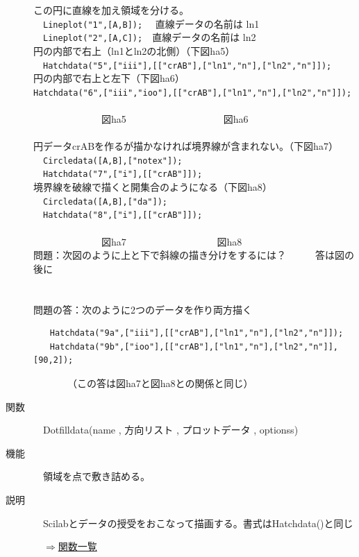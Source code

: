 \documentclass[papersize,a4paper,12pt,uplatex]{jsarticle}
\begin{document}
\begin{description}
この円に直線を加え領域を分ける。\\
　\verb|Lineplot("1",[A,B]);|　 直線データの名前は ln1\\
　\verb|Lineplot("2",[A,C]);|　直線データの名前は ln2\\
円の内部で右上（ln1とln2の北側）（下図ha5）\\
　\verb|Hatchdata("5",["iii"],[["crAB"],["ln1","n"],["ln2","n"]]);|\\
円の内部で右上と左下（下図ha6）\\
\verb|Hatchdata("6",["iii","ioo"],[["crAB"],["ln1","n"],["ln2","n"]]);|\\

　　　\\
　　　　　　　図ha5　　　　　　　　　　図ha6\\
　\\
円データcrABを作るが描かなければ境界線が含まれない。（下図ha7）\\
　\verb|Circledata([A,B],["notex"]);|\\
　\verb|Hatchdata("7",["i"],[["crAB"]]);|\\
境界線を破線で描くと開集合のようになる（下図ha8）\\
　\verb|Circledata([A,B],["da"]);|\\
　\verb|Hatchdata("8",["i"],[["crAB"]]);|\\

　　　\\
　　　　　　　図ha7　　　　　　　　　 図ha8\\

問題：次図のように上と下で斜線の描き分けをするには？　　　答は図の後に\\

　　　　　　　　　\\
　\\
問題の答：次のように2つのデータを作り両方描く
\begin{verbatim}
　　Hatchdata("9a",["iii"],[["crAB"],["ln1","n"],["ln2","n"]]);
　　Hatchdata("9b",["ioo"],[["crAB"],["ln1","n"],["ln2","n"]],[90,2]);
\end{verbatim}
　　　　（この答は図ha7と図ha8との関係と同じ）　
　\\
\hypertarget{dotfilldata}{}
\item[関数]　Dotfilldata(name , 方向リスト , プロットデータ , optionss)
\item[機能]　領域を点で敷き詰める。
\item[説明]　Scilabとデータの授受をおこなって描画する。書式はHatchdata()と同じ\\
\begin{flushright}　\hyperlink{functionlist}{$\Rightarrow$関数一覧}\end{flushright}
　\\


\end{description}
\end{document}
